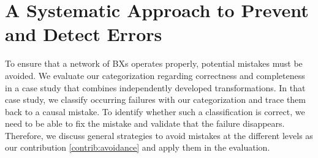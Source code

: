 \chapter{A Systematic Approach to Prevent and Detect Errors
}
\label{chap:prevention}

To ensure that a network of \acp{BX} operates properly, potential mistakes %
must be avoided.
We evaluate our categorization regarding correctness and completeness %
in a case study that combines independently developed transformations.
In that case study, we classify occurring failures with our categorization and trace them back to a causal mistake.
To identify whether such a classification is correct, we need to be able to fix the mistake and validate that the failure disappears.
Therefore, we discuss general strategies to avoid mistakes at the different levels as our contribution \ref{contrib:avoidance} and apply them in the evaluation.

